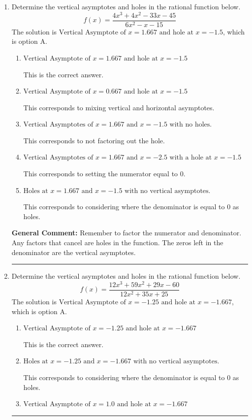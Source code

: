 \documentclass{extbook}[14pt]
\newcommand{\litem}[1]{\item #1

\rule{\textwidth}{0.4pt}}
\begin{document}
\begin{enumerate}\litem{
Determine the vertical asymptotes and holes in the rational function below.
\[ f(x) = \frac{4x^{3} +4 x^{2} -33 x -45}{6x^{2} -x -15} \]The solution is \( \text{Vertical Asymptote of } x = 1.667 \text{ and hole at } x = -1.5 \), which is option A.\begin{enumerate}[label=\Alph*.]
\item \( \text{Vertical Asymptote of } x = 1.667 \text{ and hole at } x = -1.5 \)

This is the correct answer.
\item \( \text{Vertical Asymptote of } x = 0.667 \text{ and hole at } x = -1.5 \)

This corresponds to mixing vertical and horizontal asymptotes.
\item \( \text{Vertical Asymptotes of } x = 1.667 \text{ and } x = -1.5 \text{ with no holes.} \)

This corresponds to not factoring out the hole.
\item \( \text{Vertical Asymptotes of } x = 1.667 \text{ and } x = -2.5 \text{ with a hole at } x = -1.5 \)

This corresponds to setting the numerator equal to 0.
\item \( \text{Holes at } x = 1.667 \text{ and } x = -1.5 \text{ with no vertical asymptotes.} \)

This corresponds to considering where the denominator is equal to 0 as holes.
\end{enumerate}

\textbf{General Comment:} Remember to factor the numerator and denominator. Any factors that cancel are holes in the function. The zeros left in the denominator are the vertical asymptotes.
}
\litem{
Determine the vertical asymptotes and holes in the rational function below.
\[ f(x) = \frac{12x^{3} +59 x^{2} +29 x -60}{12x^{2} +35 x + 25} \]The solution is \( \text{Vertical Asymptote of } x = -1.25 \text{ and hole at } x = -1.667 \), which is option A.\begin{enumerate}[label=\Alph*.]
\item \( \text{Vertical Asymptote of } x = -1.25 \text{ and hole at } x = -1.667 \)

This is the correct answer.
\item \( \text{Holes at } x = -1.25 \text{ and } x = -1.667 \text{ with no vertical asymptotes.} \)

This corresponds to considering where the denominator is equal to 0 as holes.
\item \( \text{Vertical Asymptote of } x = 1.0 \text{ and hole at } x = -1.667 \)


\end{enumerate}}
\end{enumerate}
\end{document}
